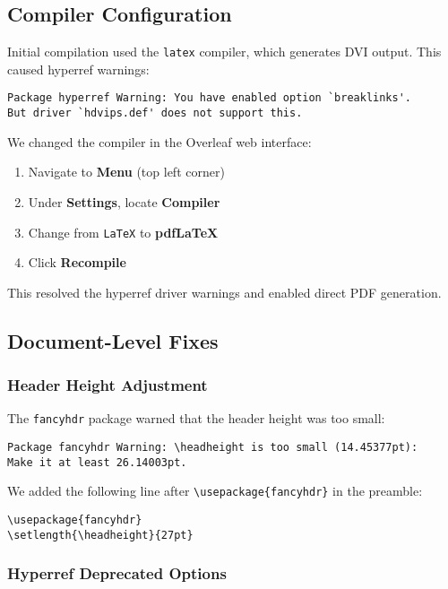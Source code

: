 \subsection{Compiler Configuration}

Initial compilation used the \verb|latex| compiler, which generates DVI output. This caused hyperref warnings:

\begin{verbatim}
Package hyperref Warning: You have enabled option `breaklinks'.
But driver `hdvips.def' does not support this.
\end{verbatim}

We changed the compiler in the Overleaf web interface:

\begin{enumerate}
  \item Navigate to \textbf{Menu} (top left corner)
  \item Under \textbf{Settings}, locate \textbf{Compiler}
  \item Change from \texttt{LaTeX} to \textbf{pdfLaTeX}
  \item Click \textbf{Recompile}
\end{enumerate}

This resolved the hyperref driver warnings and enabled direct PDF generation.

\subsection{Document-Level Fixes}

\subsubsection{Header Height Adjustment}

The \verb|fancyhdr| package warned that the header height was too small:

\begin{verbatim}
Package fancyhdr Warning: \headheight is too small (14.45377pt): 
Make it at least 26.14003pt.
\end{verbatim}

We added the following line after \verb|\usepackage{fancyhdr}| in the preamble:

\begin{verbatim}
\usepackage{fancyhdr}
\setlength{\headheight}{27pt}
\end{verbatim}

\subsubsection{Hyperref Deprecated Options}

